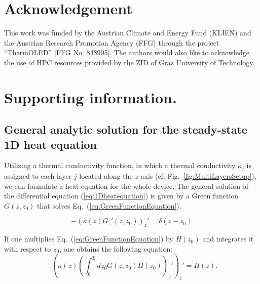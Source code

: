 \documentclass[%
9pt,
 aip,
rsi,%
 amsmath,amssymb,
preprint,%
]{revtex4-1}
\begin{document}
\section{Acknowledgement}
This work was funded by the Austrian Climate and Energy Fund (KLIEN) and the Austrian Research Promotion Agency (FFG) through the project “ThermOLED” [FFG No. 848905]. The authors would also like to acknowledge the use of HPC resources provided by the ZID of Graz University of Technology.


\clearpage

\clearpage

\section*{Supporting information.}

\subsection*{General analytic solution for the steady-state 1D heat equation}


Utilizing a thermal conductivity function, in which a thermal conductivity $\kappa_j$ is assigned to each layer $j$ located along the $z$-axis (cf. Fig.~\ref{fig:MultiLayersSetup}), we can formulate a heat equation for the whole device.
The general solution of the differential equation (\ref{eq:1Dheatequation}) is given by a Green function $G(z,z_0)$ that solves Eq.~(\ref{eq:GreenFunctionEquation}). 

\begin{equation}
	-\left( \kappa(z) G_z'(z,z_0)  \right)_z' = \delta(z-z_0)
    \label{eq:GreenFunctionEquation}
\end{equation}

If one multiplies Eq.~(\ref{eq:GreenFunctionEquation}) by $H(z_0)$ and integrates it with respect to $z_0$, one obtains the following equation: %
\begin{equation}
	-{\left(\kappa (z) \left(\int_0^L dz_0 G(z,z_0) H(z_0) \right)_z' \right)}_z' = H(z).
	\label{eq:GreenFunctionHeatEquation}
\end{equation}
\end{document}

